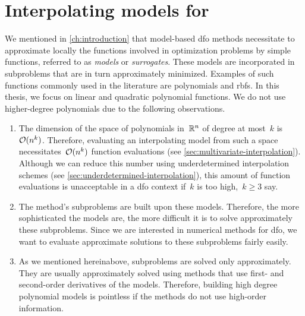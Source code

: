 %
%
%
\chapter{Interpolating models for }

We mentioned in \cref{ch:introduction} that model-based \gls{dfo} methods necessitate to approximate locally the functions involved in optimization problems by simple functions, referred to as \emph{models} or \emph{surrogates}.
These models are incorporated in subproblems that are in turn approximately minimized.
Examples of such functions commonly used in the literature are polynomials and \glspl{rbf}.
In this thesis, we focus on linear and quadratic polynomial functions.
We do not use higher-degree polynomials due to the following observations.
\begin{enumerate}
    \item The dimension of the space of polynomials in~$\mathbb{R}^n$ of degree at most~$k$ is~$\operatorname{\mathcal{O}}(n^k)$.
    Therefore, evaluating an interpolating model from such a space necessitates~$\operatorname{\mathcal{O}}(n^k)$ function evaluations (see \cref{sec:multivariate-interpolation}).
    Although we can reduce this number using underdetermined interpolation schemes (see \cref{sec:underdetermined-interpolation}), this amount of function evaluations is unacceptable in a \gls{dfo} context if~$k$ is too high,~$k \ge 3$ say.
    \item The method's subproblems are built upon these models. 
    Therefore, the more sophisticated the models are, the more difficult it is to solve approximately these subproblems.
    Since we are interested in numerical methods for \gls{dfo}, we want to evaluate approximate solutions to these subproblems fairly easily.
    \item As we mentioned hereinabove, subproblems are solved only approximately.
    They are usually approximately solved using methods that use first- and second-order derivatives of the models.
    Therefore, building high degree polynomial models is pointless if the methods do not use high-order information.
\end{enumerate}

